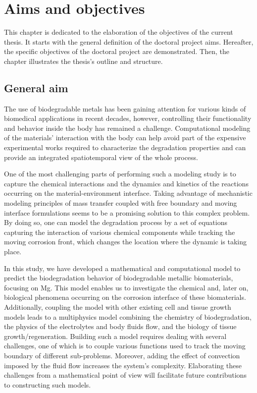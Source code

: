\chapter{Aims and objectives}\label{ch:objective}

This chapter is dedicated to the elaboration of the objectives of the current thesis. It starts with the general definition of the doctoral project aims. Hereafter, the specific objectives of the doctoral project are demonstrated. Then, the chapter illustrates the thesis's outline and structure.


\section{General aim}


The use of biodegradable metals has been gaining attention for various kinds of biomedical applications in recent decades, however, controlling their functionality and behavior inside the body has remained a challenge. Computational modeling of the materials’ interaction with the body can help avoid part of the expensive experimental works required to characterize the degradation properties and can provide an integrated spatiotemporal view of the whole process.

One of the most challenging parts of performing such a modeling study is to capture the chemical interactions and the dynamics and kinetics of the reactions occurring on the material-environment interface. Taking advantage of mechanistic modeling principles of mass transfer coupled with free boundary and moving interface formulations seems to be a promising solution to this complex problem. By doing so, one can model the degradation process by a set of equations capturing the interaction of various chemical components while tracking the moving corrosion front, which changes the location where the dynamic is taking place.

In this study, we have developed a mathematical and computational model to predict the biodegradation behavior of biodegradable metallic biomaterials, focusing on Mg. This model enables us to investigate the chemical and, later on, biological phenomena occurring on the corrosion interface of these biomaterials. Additionally, coupling the model with other existing cell and tissue growth models leads to a multiphysics model combining the chemistry of biodegradation, the physics of the electrolytes and body fluids flow, and the biology of tissue growth/regeneration. Building such a model requires dealing with several challenges, one of which is to couple various functions used to track the moving boundary of different sub-problems. Moreover, adding the effect of convection imposed by the fluid flow increases the system's complexity. Elaborating these challenges from a mathematical point of view will facilitate future contributions to constructing such models.


